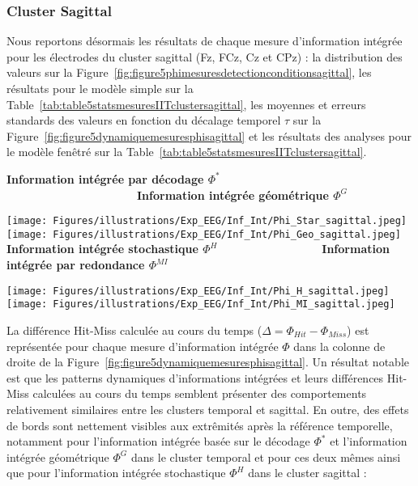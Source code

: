\subsubsection{Cluster Sagittal}
\label{resultatstiiclustersagittal}

Nous reportons désormais les résultats de chaque mesure d'information intégrée pour les électrodes du cluster sagittal (Fz, FCz, Cz et CPz) : la distribution des valeurs sur la Figure~\ref{fig:figure5phimesuresdetectionconditionsagittal}, les résultats pour le modèle simple sur la Table~\ref{tab:table5statsmesuresIITclustersagittal}, les moyennes et erreurs standards des valeurs en fonction du décalage temporel $\tau$ sur la Figure~\ref{fig:figure5dynamiquemesuresphisagittal} et les résultats des analyses pour le modèle fenêtré sur la Table~\ref{tab:table5statsmesuresIITclustersagittal}. 

\begin{figure*}[!t]
\centering
\textbf{Information intégrée par décodage $\Phi^{*}$~~~~~~~~~~~~~~~~~~~~Information intégrée géométrique $\Phi^{G}$}\par\medskip
\texttt{[image: Figures/illustrations/Exp\_EEG/Inf\_Int/Phi\_Star\_sagittal.jpeg]}
\texttt{[image: Figures/illustrations/Exp\_EEG/Inf\_Int/Phi\_Geo\_sagittal.jpeg]}
\textbf{Information intégrée stochastique $\Phi^{H}$~~~~~~~~~~~~~~~~Information intégrée par redondance $\Phi^{MI}$}\par\medskip
\texttt{[image: Figures/illustrations/Exp\_EEG/Inf\_Int/Phi\_H\_sagittal.jpeg]}
\texttt{[image: Figures/illustrations/Exp\_EEG/Inf\_Int/Phi\_MI\_sagittal.jpeg]}
\caption[Mesures d'information intégrée du cluster sagittal pour la détection et la condition.]{Mesures d'information intégrée représentées pour le cluster sagittal sous forme de violin-plot en fonction de la détection (cibles détectées, en rouge; cibles manquées, en bleu) et de la condition (avant la détection; après la détection) : $\Phi^{*}$ (Haut Gauche) ; $\Phi^{G}$ (Haut Droite) ; $\Phi^{H}$ (Bas Gauche) et $\Phi^{MI}$ (Bas Droite).}
\label{fig:figure5phimesuresdetectionconditionsagittal}
\end{figure*}

La différence Hit-Miss calculée au cours du temps ($\Delta = \Phi_{Hit} - \Phi_{Miss}$) est représentée pour chaque mesure d'information intégrée $\Phi$ dans la colonne de droite de la Figure~\ref{fig:figure5dynamiquemesuresphisagittal}. 
Un résultat notable est que les patterns dynamiques d'informations intégrées et leurs différences Hit-Miss calculées au cours du temps semblent présenter des comportements relativement similaires entre les clusters temporal et sagittal. 
En outre, des effets de bords sont nettement visibles aux extrêmités après la référence temporelle, notamment pour l'information intégrée basée sur le décodage $\Phi^{*}$ et l'information intégrée géométrique $\Phi^{G}$ dans le cluster temporal et pour ces deux mêmes ainsi que pour l'information intégrée stochastique $\Phi^{H}$ dans le cluster sagittal : \\

